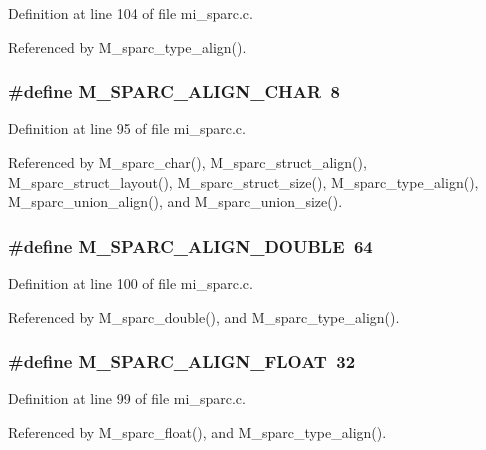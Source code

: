 Definition at line 104 of file mi\_\-sparc.c.

Referenced by M\_\-sparc\_\-type\_\-align().
\subsubsection{\setlength{\rightskip}{0pt plus 5cm}\#define M\_\-SPARC\_\-ALIGN\_\-CHAR~8}\label{mi__sparc_8c_9d5e39477244c53246b4fd8b0cb97a01}




Definition at line 95 of file mi\_\-sparc.c.

Referenced by M\_\-sparc\_\-char(), M\_\-sparc\_\-struct\_\-align(), M\_\-sparc\_\-struct\_\-layout(), M\_\-sparc\_\-struct\_\-size(), M\_\-sparc\_\-type\_\-align(), M\_\-sparc\_\-union\_\-align(), and M\_\-sparc\_\-union\_\-size().
\subsubsection{\setlength{\rightskip}{0pt plus 5cm}\#define M\_\-SPARC\_\-ALIGN\_\-DOUBLE~64}\label{mi__sparc_8c_ed359b3e0b8120d45c6427d0b30e81fc}




Definition at line 100 of file mi\_\-sparc.c.

Referenced by M\_\-sparc\_\-double(), and M\_\-sparc\_\-type\_\-align().
\subsubsection{\setlength{\rightskip}{0pt plus 5cm}\#define M\_\-SPARC\_\-ALIGN\_\-FLOAT~32}\label{mi__sparc_8c_e332220fd6707d9a2e5c2fc08a352d71}




Definition at line 99 of file mi\_\-sparc.c.

Referenced by M\_\-sparc\_\-float(), and M\_\-sparc\_\-type\_\-align().

